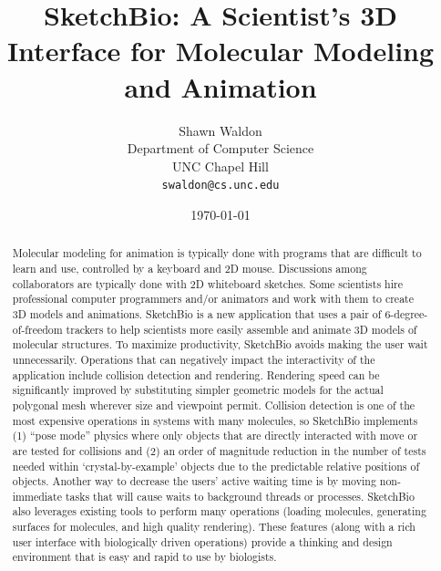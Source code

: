 \documentclass{article} %
\begin{document}
\title{SketchBio: A Scientist's 3D Interface for Molecular Modeling and Animation}
\author{Shawn Waldon\\Department of Computer Science\\
			UNC Chapel Hill\\\texttt{swaldon@cs.unc.edu}}
\date{\today}
\maketitle

\begin{abstract}
Molecular modeling for animation is typically done with programs that are difficult to learn and use, controlled by a keyboard and 2D mouse.  Discussions among collaborators are typically done with 2D whiteboard sketches.  Some scientists hire professional computer programmers and/or animators and work with them to create 3D models and animations.  SketchBio is a new application that uses a pair of 6-degree-of-freedom trackers to help scientists more easily assemble and animate 3D models of molecular structures.  To maximize productivity, SketchBio avoids making the user wait unnecessarily.  Operations that can negatively impact the interactivity of the application include collision detection and rendering.  Rendering speed can be significantly improved by substituting simpler geometric models for the actual polygonal mesh wherever size and viewpoint permit.  Collision detection is one of the most expensive operations in systems with many molecules, so SketchBio implements (1) “pose mode” physics where only objects that are directly interacted with move or are tested for collisions and (2) an order of magnitude reduction in the number of tests needed within ‘crystal-by-example' objects due to the predictable relative positions of objects.  Another way to decrease the users' active waiting time is by moving non-immediate tasks that will cause waits to background threads or processes.  SketchBio also leverages existing tools to perform many operations (loading molecules, generating surfaces for molecules, and high quality rendering).  These features (along with a rich user interface with biologically driven operations) provide a thinking and design environment that is easy and rapid to use by biologists.

\end{abstract}
\end{document}
